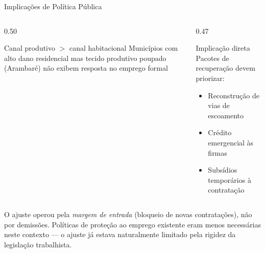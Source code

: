 \documentclass[11pt, aspectratio=169]{beamer}
\begin{document}
\begin{frame}{Implicações de Política Pública}

\begin{columns}[T]
\begin{column}{0.50\textwidth}
  \begin{alertblock}{Canal produtivo $>$ canal habitacional}
    Municípios com alto dano residencial mas tecido produtivo poupado (Arambaré) não exibem resposta no emprego formal
  \end{alertblock}
\end{column}
\begin{column}{0.47\textwidth}
  \begin{block}{Implicação direta}
    Pacotes de recuperação devem priorizar:
    \begin{itemize}
      \item Reconstrução de vias de escoamento
      \item Crédito emergencial às firmas
      \item Subsídios temporários à contratação
    \end{itemize}
  \end{block}
\end{column}
\end{columns}

\medskip
\footnotesize
O ajuste operou pela \emph{margem de entrada} (bloqueio de novas contratações), não por demissões. Políticas de proteção ao emprego existente eram menos necessárias neste contexto --- o ajuste já estava naturalmente limitado pela rigidez da legislação trabalhista.

\end{frame}
\end{document}
